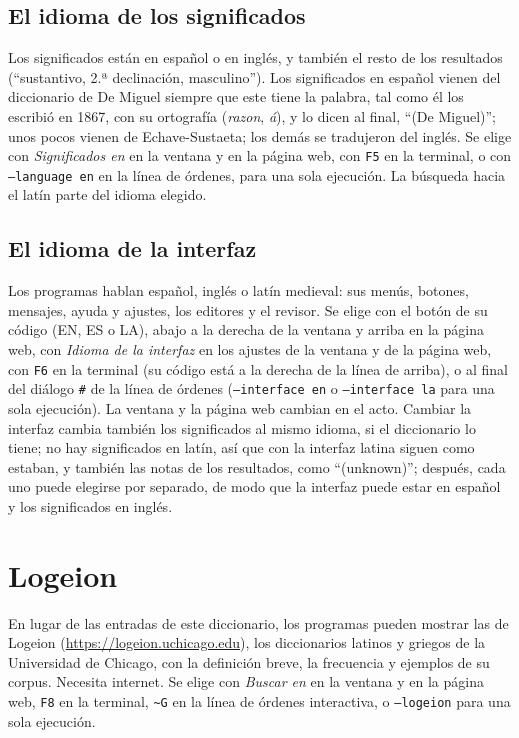 \documentclass[12pt,
              article,
              oneside
              ]{memoir}
\newcommand*{\menu}[1]{\textit{#1}}
\newcommand*{\key}[1]{\texttt{#1}}
\newcommand*{\tl}{\textasciitilde}
\begin{document}
\subsection{El idioma de los significados}

%
Los significados están en español o en inglés, y también el resto de los
resultados (\enquote{sustantivo, 2.ª declinación, masculino}). Los
significados en español vienen del diccionario de De Miguel siempre que
este tiene la palabra, tal como él los escribió en 1867, con su ortografía
(\textit{razon}, \textit{á}), y lo dicen al final, \enquote{(De Miguel)};
unos pocos vienen de Echave-Sustaeta; los demás se tradujeron del inglés.
Se elige con \menu{Significados en} en la ventana y en la página web, con
\key{F5} en la terminal, o con \texttt{--language en} en la línea de
órdenes, para una sola ejecución. La búsqueda hacia el latín parte del
idioma elegido.

\subsection{El idioma de la interfaz}

%
Los programas hablan español, inglés o latín medieval: sus menús,
botones, mensajes,
ayuda y ajustes, los editores y el revisor. Se elige con el botón de su
código (EN, ES o LA), abajo a la derecha de la ventana y arriba en la
página web, con \menu{Idioma de la interfaz} en los ajustes de la ventana
y de la página web, con \key{F6} en la terminal (su código está a la
derecha de la línea de arriba), o al final del diálogo \texttt{\#} de la línea de
órdenes (\texttt{--interface en} o \texttt{--interface la} para una sola
ejecución). La ventana y la página web cambian en el acto. Cambiar la
interfaz cambia también los significados al mismo idioma, si el
diccionario lo tiene; no hay significados en latín, así que con la
interfaz latina siguen como estaban, y también las notas de los
resultados, como \enquote{(unknown)}; después, cada uno puede elegirse por
separado, de modo que la interfaz puede estar en español y los
significados en inglés.

\section{Logeion}
\label{sec:logeion}

%
En lugar de las entradas de este diccionario, los programas pueden
mostrar las de Logeion (\url{https://logeion.uchicago.edu}), los
diccionarios latinos y griegos de la Universidad de Chicago, con la
definición breve, la frecuencia y ejemplos de su corpus. Necesita
internet. Se elige con \menu{Buscar en} en la ventana y en la página web,
\key{F8} en la terminal, \texttt{\tl G} en la línea de órdenes
interactiva, o \texttt{--logeion} para una sola ejecución.
\end{document}
